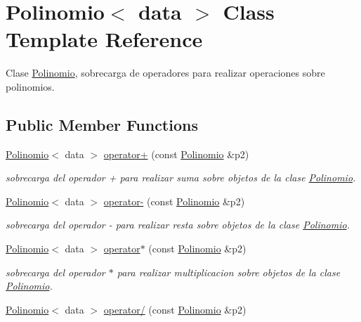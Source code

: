 \hypertarget{classPolinomio}{\section{Polinomio$<$ data $>$ Class Template Reference}
\label{classPolinomio}
}


Clase \hyperlink{classPolinomio}{Polinomio}, sobrecarga de operadores para realizar operaciones sobre polinomios.  


\subsection*{Public Member Functions}
\begin{DoxyCompactItemize}
\item 
\hypertarget{classPolinomio_ad514db23c9e875edeba9ae80480f416b}{\hyperlink{classPolinomio}{Polinomio}$<$ data $>$ \hyperlink{classPolinomio_ad514db23c9e875edeba9ae80480f416b}{operator+} (const \hyperlink{classPolinomio}{Polinomio} \&p2)}\label{classPolinomio_ad514db23c9e875edeba9ae80480f416b}

\begin{DoxyCompactList}\small\item\em sobrecarga del operador + para realizar suma sobre objetos de la clase \hyperlink{classPolinomio}{Polinomio}. \end{DoxyCompactList}\item 
\hypertarget{classPolinomio_a7ee6d8382d2aba060a253a58be847756}{\hyperlink{classPolinomio}{Polinomio}$<$ data $>$ \hyperlink{classPolinomio_a7ee6d8382d2aba060a253a58be847756}{operator-\/} (const \hyperlink{classPolinomio}{Polinomio} \&p2)}\label{classPolinomio_a7ee6d8382d2aba060a253a58be847756}

\begin{DoxyCompactList}\small\item\em sobrecarga del operador -\/ para realizar resta sobre objetos de la clase \hyperlink{classPolinomio}{Polinomio}. \end{DoxyCompactList}\item 
\hypertarget{classPolinomio_a88d04358f6846e41731bf07af8c59529}{\hyperlink{classPolinomio}{Polinomio}$<$ data $>$ \hyperlink{classPolinomio_a88d04358f6846e41731bf07af8c59529}{operator$\ast$} (const \hyperlink{classPolinomio}{Polinomio} \&p2)}\label{classPolinomio_a88d04358f6846e41731bf07af8c59529}

\begin{DoxyCompactList}\small\item\em sobrecarga del operador $\ast$ para realizar multiplicacion sobre objetos de la clase \hyperlink{classPolinomio}{Polinomio}. \end{DoxyCompactList}\item 
\hypertarget{classPolinomio_ad0bc345d3957519f4771565017dbcc46}{\hyperlink{classPolinomio}{Polinomio}$<$ data $>$ \hyperlink{classPolinomio_ad0bc345d3957519f4771565017dbcc46}{operator/} (const \hyperlink{classPolinomio}{Polinomio} \&p2)}\label{classPolinomio_ad0bc345d3957519f4771565017dbcc46}


\end{DoxyCompactItemize}
